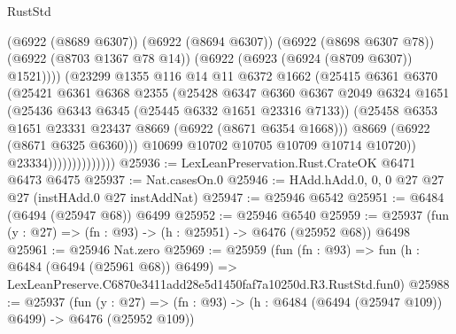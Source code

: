 \begin{lexlean}{RustStd}
\begin{coremodule}
                                  (@6922 (@8689 @6307))
                                  (@6922 (@8694 @6307))
                                  (@6922 (@8698 @6307 @78))
                                  (@6922 (@8703 @1367 @78 @14))
                                  (@6922 (@6923 (@6924 (@8709 @6307)) @1521))))
                              (@23299
                                @1355
                                @116
                                @14
                                @11
                                @6372
                                @1662
                                (@25415
                                  @6361
                                  @6370
                                  (@25421
                                    @6361
                                    @6368
                                    @2355
                                    (@25428
                                      @6347
                                      @6360
                                      @6367
                                      @2049
                                      @6324
                                      @1651
                                      (@25436 @6343 @6345 (@25445 @6332 @1651 @23316 @7133))
                                      (@25458
                                        @6353
                                        @1651
                                        @23331
                                        @23437
                                        @8669
                                        (@6922 (@8671 @6354 @1668)))
                                      @8669
                                      (@6922 (@8671 @6325 @6360)))
                                    @10699
                                    @10702
                                    @10705
                                    @10709
                                    @10714
                                    @10720))
                                @23334))))))))))))))
@25936 := LexLeanPreservation.Rust.CrateOK @6471 @6473 @6475
@25937 := Nat.casesOn.{0}
@25946 := HAdd.hAdd.{0, 0, 0} @27 @27 @27 (instHAdd.{0} @27 instAddNat)
@25947 := @25946 @6542
@25951 := @6484 (@6494 (@25947 @68)) @6499
@25952 := @25946 @6540
@25959 := @25937 (fun (y : @27) => (fn : @93) -> (h : @25951) -> @6476 (@25952 @68)) @6498
@25961 := @25946 Nat.zero
@25969 := @25959
    (fun (fn : @93) =>
    fun (h : @6484 (@6494 (@25961 @68)) @6499) =>
    LexLeanPreserve.C6870e3411add28e5d1450faf7a10250d.R3.RustStd.fun0)
@25988 := @25937
    (fun (y : @27) => (fn : @93) -> (h : @6484 (@6494 (@25947 @109)) @6499) -> @6476 (@25952 @109))

\end{coremodule}
\end{lexlean}
